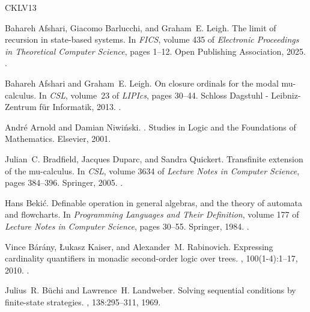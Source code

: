\documentclass[11pt,a4paper]{amsart}
\theoremstyle{plain}
\theoremstyle{definition}
\theoremstyle{defC}
\theoremstyle{thmC}
\theoremstyle{plain}
\numberwithin{equation}{section}
\numberwithin{equation}{section}
\numberwithin{figure}{section}
\begin{document}
\newcommand{\etalchar}[1]{$^{#1}$}
\begin{thebibliography}{CKLV13}

Bahareh Afshari, Giacomo Barlucchi, and Graham~E. Leigh.
\newblock The limit of recursion in state-based systems.
\newblock In {\em {FICS}}, volume 435 of {\em Electronic Proceedings in
  Theoretical Computer Science}, pages 1--12. Open Publishing Association,
  2025.
\newblock \href {https://doi.org/10.4204/EPTCS.435.1}
  {}.

Bahareh Afshari and Graham~E. Leigh.
\newblock On closure ordinals for the modal mu-calculus.
\newblock In {\em {CSL}}, volume~23 of {\em LIPIcs}, pages 30--44. Schloss
  Dagstuhl - Leibniz-Zentrum f{\"{u}}r Informatik, 2013.
\newblock \href {https://doi.org/10.4230/LIPICS.CSL.2013.30}
  {}.

Andr{\'{e}} Arnold and Damian Niwi{\'{n}}ski.
.
\newblock Studies in Logic and the Foundations of Mathematics. Elsevier, 2001.

Julian~C. Bradfield, Jacques Duparc, and Sandra Quickert.
\newblock Transfinite extension of the mu-calculus.
\newblock In {\em CSL}, volume 3634 of {\em Lecture Notes in Computer Science},
  pages 384--396. Springer, 2005.
\newblock \href {https://doi.org/10.1007/11538363_27}
  {}.

Hans Beki{\'{c}}.
\newblock Definable operation in general algebras, and the theory of automata
  and flowcharts.
\newblock In {\em Programming Languages and Their Definition}, volume 177 of
  {\em Lecture Notes in Computer Science}, pages 30--55. Springer, 1984.
\newblock \href {https://doi.org/10.1007/BFB0048939}
  {}.

Vince B{\'{a}}r{\'{a}}ny, {\L}ukasz Kaiser, and Alexander~M. Rabinovich.
\newblock Expressing cardinality quantifiers in monadic second-order logic over
  trees.
, 100(1-4):1--17, 2010.
\newblock \href {https://doi.org/10.3233/FI-2010-260}
  {}.

Julius~R. B{\"{u}}chi and Lawrence~H. Landweber.
\newblock Solving sequential conditions by finite-state strategies.
,
  138:295--311, 1969.


\end{thebibliography}
\end{document}
